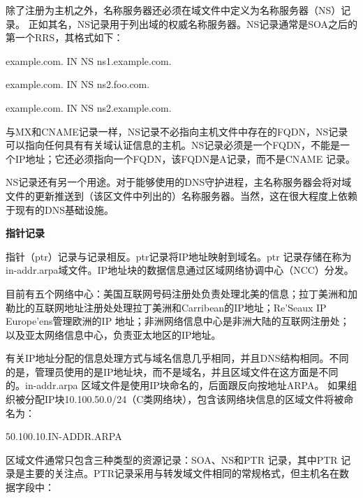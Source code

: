 ﻿\documentclass[english,runningheads,a4paper]{llncs}[2018/03/10]
\begin{document}
\par\noindent 除了注册为主机之外，名称服务器还必须在域文件中定义为名称服务器（NS）记录。
正如其名，NS记录用于列出域的权威名称服务器。NS记录通常是SOA之后的第一个RRS，其格式如下：
\par\setlength\parindent{2em}example.com. \qquad IN \qquad NS \qquad ns1.example.com.

\par\setlength\parindent{2em}example.com. \qquad IN \qquad NS \qquad ns2.foo.com.

\par\setlength\parindent{2em}example.com. \qquad IN \qquad NS \qquad ns2.example.com.

与MX和CNAME记录一样，NS记录不必指向主机文件中存在的FQDN，NS记录可以指向任何具有有关域认证信息的主机。NS记录必须是一个FQDN，不能是一个IP地址；它还必须指向一个FQDN，该FQDN是A记录，而不是CNAME 记录。

NS记录还有另一个用途。对于能够使用的DNS守护进程，主名称服务器会将对域文件的更新推送到（该区文件中列出的）名称服务器。当然，这在很大程度上依赖于现有的DNS基础设施。

\vbox{}

\par\noindent\textbf{指针记录}

\par\noindent 指针（ptr）记录与记录相反。ptr记录将IP地址映射到域名。ptr 记录存储在称为in-addr.arpa域文件。IP地址块的数据信息通过区域网络协调中心（NCC）分发。

\par\setlength\parindent{2em}目前有五个网络中心：美国互联网号码注册处负责处理北美的信息；拉丁美洲和加勒比的互联网地址注册处处理拉丁美洲和Carribean的IP地址；Re'Seaux IP Europe'ens管理欧洲的IP 地址；非洲网络信息中心是非洲大陆的互联网注册处；以及亚太网络信息中心，负责亚太地区的IP地址。

\par\setlength\parindent{2em}有关IP地址分配的信息处理方式与域名信息几乎相同，并且DNS结构相同。不同的是，管理员使用的是IP地址块，而不是域名，并且区域文件在这方面是不同的。in-addr.arpa 区域文件是使用IP块命名的，后面跟反向按地址ARPA。 如果组织被分配IP块10.100.50.0/24（C类网络块），包含该网络块信息的区域文件将被命名为：

\par\setlength\parindent{2em}50.100.10.IN-ADDR.ARPA

\par\setlength\parindent{2em}区域文件通常只包含三种类型的资源记录：SOA、NS和PTR 记录，其中PTR 记录是主要的关注点。PTR记录采用与转发域文件相同的常规格式，但主机名在数据字段中：
\end{document}
